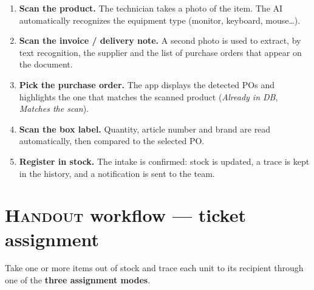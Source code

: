 \documentclass[11pt,a4paper]{article}
\begin{document}
\begin{enumerate}
  \item \textbf{Scan the product.} The technician takes a photo of
        the item. The AI automatically recognizes the equipment type
        (monitor, keyboard, mouse\dots).
  \item \textbf{Scan the invoice / delivery note.} A second photo is
        used to extract, by text recognition, the supplier and the
        list of purchase orders that appear on the document.
  \item \textbf{Pick the purchase order.} The app displays the
        detected POs and highlights the one that matches the scanned
        product (\emph{Already in DB}, \emph{Matches the scan}).
  \item \textbf{Scan the box label.} Quantity, article number and
        brand are read automatically, then compared to the selected PO.
  \item \textbf{Register in stock.} The intake is confirmed: stock is
        updated, a trace is kept in the history, and a notification
        is sent to the team.
\end{enumerate}

\begin{center}
\end{center}

\section{\textsc{Handout} workflow — ticket assignment}

\begin{infobox}[Goal]
Take one or more items out of stock and trace each unit to its
recipient through one of the \textbf{three assignment modes}.
\end{infobox}
\end{document}
